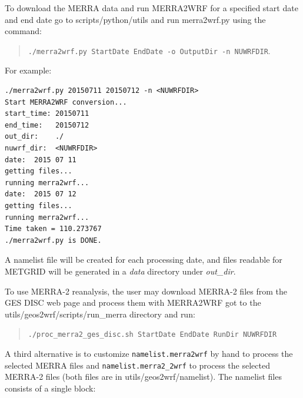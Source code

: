 To download the MERRA data and run MERRA2WRF for a specified start date
and end date go to scripts/python/utils and run merra2wrf.py using the command:
\begin{quote}
  \texttt{./merra2wrf.py StartDate EndDate -o OutputDir -n NUWRFDIR}.
\end{quote}
For example:
\begin{verbatim}
./merra2wrf.py 20150711 20150712 -n <NUWRFDIR>
Start MERRA2WRF conversion...
start_time: 20150711
end_time:   20150712
out_dir:    ./
nuwrf_dir:  <NUWRFDIR>
date:  2015 07 11
getting files...
running merra2wrf...
date:  2015 07 12
getting files...
running merra2wrf...
Time taken = 110.273767
./merra2wrf.py is DONE.
\end{verbatim}

A namelist file will be created for each processing date, and files readable 
for METGRID will be generated in a \emph{data} directory under \emph{out\_dir}.  

To use MERRA-2 reanalysis, the user may download MERRA-2 files from the
GES DISC web page and process them with MERRA2WRF got to the
utils/geos2wrf/scripts/run\_merra directory and run:
\begin{quote}
\texttt{./proc\_merra2\_ges\_disc.sh StartDate EndDate RunDir NUWRFDIR}
\end{quote}

A third alternative is to customize \texttt{namelist.merra2wrf} 
by hand to  process the selected MERRA files and \texttt{namelist.merra2\_2wrf} to process
the selected MERRA-2 files (both files are in utils/geos2wrf/namelist). The namelist files consists of a single block:

